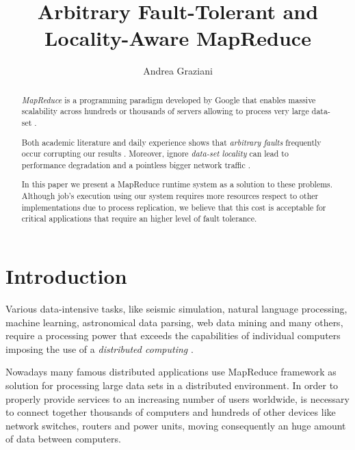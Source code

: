 \documentclass[sigchi]{acmart}
\begin{document}
\title{Arbitrary Fault-Tolerant and Locality-Aware MapReduce}

\author{Andrea Graziani}

\renewcommand{\shortauthors}{Andrea Graziani (0273395)}





\begin{abstract}
\textit{MapReduce} is a programming paradigm developed by Google that enables massive scalability across hundreds or thousands of servers allowing to process very large data-set \cite{IBMWhatIsMapReduce}.

Both academic literature and daily experience shows that \textit{arbitrary faults} frequently occur corrupting our results \cite{BFLMapReduce}. Moreover, ignore \textit{data-set locality} can lead to performance degradation and a pointless bigger network traffic \cite{LARTS}.

In this paper we present a MapReduce runtime system as a solution to these problems. Although job's execution using our system requires more resources respect to other implementations due to process replication, we believe that this cost is acceptable for critical applications that require an higher level of fault tolerance.
\end{abstract}

\maketitle

\section{Introduction}

Various data-intensive tasks, like seismic simulation, natural language processing, machine learning, astronomical data parsing, web data mining and many others, require a processing power that exceeds the capabilities of individual computers imposing the use of a \textit{distributed computing} \cite{LARTS}.

Nowadays many famous distributed applications use MapReduce framework as solution for processing large data sets in a distributed environment. In order to properly provide services to an increasing number of users worldwide, is necessary to connect together thousands of computers and hundreds of other devices like network switches, routers and power units, moving consequently an huge amount of data between computers. 
\end{document}

